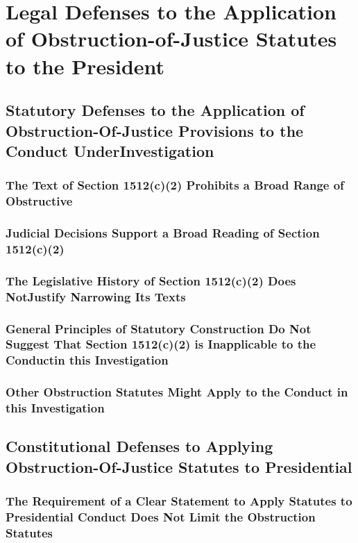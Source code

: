 \section{Legal Defenses to the Application of Obstruction-of-Justice Statutes to the President}

\subsection{Statutory Defenses to the Application of Obstruction-Of-Justice Provisions to the Conduct UnderInvestigation}

\subsubsection{The Text of Section 1512(c)(2) Prohibits a Broad Range of Obstructive}

\subsubsection{Judicial Decisions Support a Broad Reading of Section 1512(c)(2)}

\subsubsection{The Legislative History of Section 1512(c)(2) Does NotJustify Narrowing Its Texts}

\subsubsection{General Principles of Statutory Construction Do Not Suggest That Section 1512(c)(2) is Inapplicable to the Conductin this Investigation}

\subsubsection{Other Obstruction Statutes Might Apply to the Conduct in this Investigation}

\subsection{Constitutional Defenses to Applying Obstruction-Of-Justice Statutes to Presidential}

\subsubsection{The Requirement of a Clear Statement to Apply Statutes to Presidential Conduct Does Not Limit the Obstruction Statutes}

